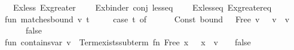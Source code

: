 \begin{isabellebody}
\ \ \ \ {\isacharparenleft}{\kern0pt}\isactrlsyntaxUNDERSCOREconst {\isasymopen}{\isacharunderscore}{\kern0pt}Ex{\isacharunderscore}{\kern0pt}less{\isasymclose}{\isacharcomma}{\kern0pt}\ \isactrlsyntaxUNDERSCOREconst {\isasymopen}{\isacharunderscore}{\kern0pt}Ex{\isacharunderscore}{\kern0pt}greater{\isasymclose}{\isacharparenright}{\kern0pt}{\isacharparenright}{\kern0pt}{\isacharcomma}{\kern0pt}\isanewline
\ \ \ \ {\isacharparenleft}{\kern0pt}{\isacharparenleft}{\kern0pt}Ex{\isacharunderscore}{\kern0pt}binder{\isacharcomma}{\kern0pt}\ conj{\isacharcomma}{\kern0pt}\ less{\isacharunderscore}{\kern0pt}eq{\isacharparenright}{\kern0pt}{\isacharcomma}{\kern0pt}\isanewline
\ \ \ \ {\isacharparenleft}{\kern0pt}\isactrlsyntaxUNDERSCOREconst {\isasymopen}{\isacharunderscore}{\kern0pt}Ex{\isacharunderscore}{\kern0pt}less{\isacharunderscore}{\kern0pt}eq{\isasymclose}{\isacharcomma}{\kern0pt}\ \isactrlsyntaxUNDERSCOREconst {\isasymopen}{\isacharunderscore}{\kern0pt}Ex{\isacharunderscore}{\kern0pt}greater{\isacharunderscore}{\kern0pt}eq{\isasymclose}{\isacharparenright}{\kern0pt}{\isacharparenright}{\kern0pt}{\isacharbrackright}{\kern0pt}{\isacharsemicolon}{\kern0pt}\isanewline
\isanewline
\ \ fun\ matches{\isacharunderscore}{\kern0pt}bound\ v\ t\ {\isacharequal}{\kern0pt}\isanewline
\ \ \ \ {\isacharparenleft}{\kern0pt}case\ t\ of\isanewline
\ \ \ \ \ \ Const\ {\isacharparenleft}{\kern0pt}\isactrlsyntaxUNDERSCOREconst {\isasymopen}{\isacharunderscore}{\kern0pt}bound{\isasymclose}{\isacharcomma}{\kern0pt}\ {\isacharunderscore}{\kern0pt}{\isacharparenright}{\kern0pt}\ {\isachardollar}{\kern0pt}\ Free\ {\isacharparenleft}{\kern0pt}v{\isacharprime}{\kern0pt}{\isacharcomma}{\kern0pt}\ {\isacharunderscore}{\kern0pt}{\isacharparenright}{\kern0pt}\ {\isacharequal}{\kern0pt}{\isachargreater}{\kern0pt}\ v\ {\isacharequal}{\kern0pt}\ v{\isacharprime}{\kern0pt}\isanewline
\ \ \ \ {\isacharbar}{\kern0pt}\ {\isacharunderscore}{\kern0pt}\ {\isacharequal}{\kern0pt}{\isachargreater}{\kern0pt}\ false{\isacharparenright}{\kern0pt}{\isacharsemicolon}{\kern0pt}\isanewline
\ \ fun\ contains{\isacharunderscore}{\kern0pt}var\ v\ {\isacharequal}{\kern0pt}\ Term{\isachardot}{\kern0pt}exists{\isacharunderscore}{\kern0pt}subterm\ {\isacharparenleft}{\kern0pt}fn\ Free\ {\isacharparenleft}{\kern0pt}x{\isacharcomma}{\kern0pt}\ {\isacharunderscore}{\kern0pt}{\isacharparenright}{\kern0pt}\ {\isacharequal}{\kern0pt}{\isachargreater}{\kern0pt}\ x\ {\isacharequal}{\kern0pt}\ v\ {\isacharbar}{\kern0pt}\ {\isacharunderscore}{\kern0pt}\ {\isacharequal}{\kern0pt}{\isachargreater}{\kern0pt}\ false{\isacharparenright}{\kern0pt}{\isacharsemicolon}{\kern0pt}\isanewline

\end{isabellebody}
